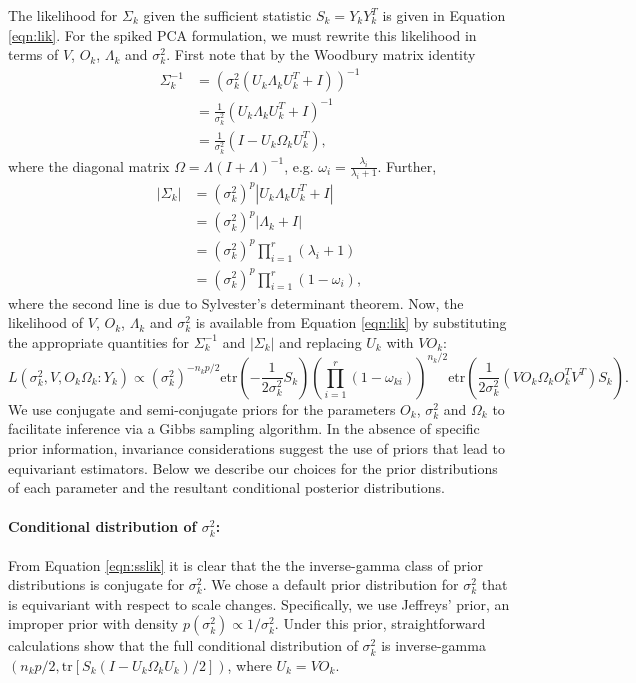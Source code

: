 \documentclass[12pt]{article}
\newcommand{\tr}{\text{tr}}
\newcommand{\etr}{\text{etr}}
\begin{document}
The likelihood for $\Sigma_k$ given the sufficient statistic
$S_k = Y_kY_k^T$ is given in Equation \ref{eqn:lik}.  For the
spiked PCA formulation, we must rewrite this likelihood in terms of $V$, $O_k$,
$\Lambda_k$ and $\sigma_k^2$.  First note that by the Woodbury matrix
identity
\begin{align}
\nonumber \Sigma^{-1}_k &=  (\sigma_k^2(U_k\Lambda_kU_k^T+I))^{-1}\\
\nonumber &= \frac{1}{\sigma_k^2}(U_k\Lambda_kU_k^T+I)^{-1}\\
&= \frac{1}{\sigma_k^2}(I-U_k\Omega_kU_k^T),
\end{align}
%
\noindent where the diagonal matrix $\Omega = \Lambda(I+\Lambda)^{-1}$, e.g. $\omega_i = \frac{\lambda_i}{\lambda_{i}+1}$.  Further, 
%
\begin{align}
\nonumber |\Sigma_k| &= (\sigma_k^2)^{p}|U_k\Lambda_kU_k^T+I|\\
\nonumber &= (\sigma_k^2)^{p}|\Lambda_k+I| \\
\nonumber &= (\sigma_k^2)^{p}\prod_{i=1}^r(\lambda_i+1)\\
&= (\sigma_k^2)^{p}\prod_{i=1}^r(1-\omega_i),
\end{align}
%
\noindent where the second line is due to Sylvester's determinant
theorem.  Now, the likelihood of $V$, $O_k$, $\Lambda_k$ and
$\sigma_k^2$ is available from Equation \ref{eqn:lik} by substituting
the appropriate quantities for $\Sigma^{-1}_k$ and $|\Sigma_k|$ and
replacing $U_k$ with $VO_k$:
%
\begin{equation}
 L(\sigma_k^2, V , O_k \Omega_k : Y_k) \propto
    (\sigma_k^2)^{-n_kp/2}\etr(-\frac{1}{2\sigma_k^2}S_k)\left(\prod_{i=1}^r(1-\omega_{ki})
   \right) ^{n_k/2}
   \etr(\frac{1}{2\sigma_k^2}(VO_k\Omega_kO_k^TV^T)S_k).
\label{eqn:sslik}
\end{equation}
%
\noindent We use conjugate and semi-conjugate priors for the parameters $O_k$,
$\sigma^2_k$ and $\Omega_k$ to facilitate inference via a Gibbs
sampling algorithm.  In the absence of specific prior information,
invariance considerations suggest the use of priors that lead to
equivariant estimators.  Below we describe our choices for the prior
distributions of each parameter and the resultant conditional posterior
distributions.

\paragraph{Conditional distribution of $\sigma_k^2$:}

From Equation \ref{eqn:sslik} it is clear that the the inverse-gamma
class of prior distributions is conjugate for $\sigma_k^2$.  We chose a
default prior distribution for $\sigma^2_k$ that is equivariant with
respect to scale changes.  Specifically, we use Jeffreys' prior, an
improper prior with density $p(\sigma^2_k) \propto 1/\sigma^2_k $.  Under
this prior, straightforward calculations show that the full
conditional distribution of $\sigma_k^2$ is
inverse-gamma$( n_k p/2 , \tr[S_k( I - U_k\Omega_k
U_k)/2])$, where $U_k = VO_k$.
\end{document}
